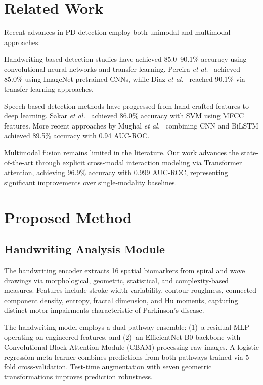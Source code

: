 \documentclass[10pt,conference,letterpaper]{IEEEtran}
\begin{document}
\section{Related Work}

Recent advances in PD detection employ both unimodal and multimodal approaches:

Handwriting-based detection studies have achieved 85.0--90.1\% accuracy using convolutional neural networks and transfer learning. Pereira \textit{et al.}~\cite{pereira2018} achieved 85.0\% using ImageNet-pretrained CNNs, while Diaz \textit{et al.}~\cite{diaz2021} reached 90.1\% via transfer learning approaches.

Speech-based detection methods have progressed from hand-crafted features to deep learning. Sakar \textit{et al.}~\cite{sakar2019} achieved 86.0\% accuracy with SVM using MFCC features. More recent approaches by Mughal \textit{et al.}~\cite{mughal2023} combining CNN and BiLSTM achieved 89.5\% accuracy with 0.94 AUC-ROC.

Multimodal fusion remains limited in the literature. Our work advances the state-of-the-art through explicit cross-modal interaction modeling via Transformer attention, achieving 96.9\% accuracy with 0.999 AUC-ROC, representing significant improvements over single-modality baselines.

\section{Proposed Method}

\subsection{Handwriting Analysis Module}

The handwriting encoder extracts 16 spatial biomarkers from spiral and wave drawings via morphological, geometric, statistical, and complexity-based measures. Features include stroke width variability, contour roughness, connected component density, entropy, fractal dimension, and Hu moments, capturing distinct motor impairments characteristic of Parkinson's disease.

The handwriting model employs a dual-pathway ensemble: (1)~a residual MLP operating on engineered features, and (2)~an EfficientNet-B0 backbone with Convolutional Block Attention Module (CBAM) processing raw images. A logistic regression meta-learner combines predictions from both pathways trained via 5-fold cross-validation. Test-time augmentation with seven geometric transformations improves prediction robustness.
\end{document}

